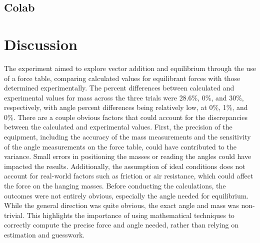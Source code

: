 \documentclass{report}
\begin{document}
    \bigbreak \noindent 
    \subsection{Colab}
    \bigbreak \noindent 
    \bigbreak \noindent 
    \bigbreak \noindent 
    \bigbreak \noindent 
    \bigbreak \noindent 











    \bigbreak \noindent 
    \section{Discussion}
    \bigbreak \noindent 
    The experiment aimed to explore vector addition and equilibrium through the use of a force table, comparing calculated values for equilibrant forces with those determined experimentally. The percent differences between calculated and experimental values for mass across the three trials were 28.6\%, 0\%, and 30\%, respectively, with angle percent differences being relatively low, at 0\%, 1\%, and 0\%.
    \bigbreak \noindent 
    There are a couple obvious factors that could account for the discrepancies between the calculated and experimental values. First, the precision of the equipment, including the accuracy of the mass measurements and the sensitivity of the angle measurements on the force table, could have contributed to the variance. Small errors in positioning the masses or reading the angles could have impacted the results. 
    \bigbreak \noindent 
    Additionally, the assumption of ideal conditions does not account for real-world factors such as friction or air resistance, which could affect the force on the hanging masses. 
    \bigbreak \noindent 
    \bigbreak \noindent 
    Before conducting the calculations, the outcomes were not entirely obvious, especially the angle needed for equilibrium. While the general direction was quite obvious, the exact angle and mass was non-trivial. This highlights the importance of using mathematical techniques to correctly compute the precise force and angle needed, rather than relying on estimation and guesswork.
    \bigbreak \noindent 
\end{document}
